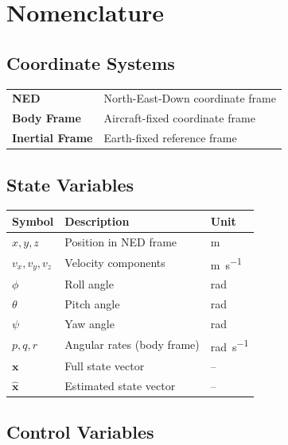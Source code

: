 
\chapter*{Nomenclature}

\section*{Coordinate Systems}

\begin{longtable}{@{}p{3cm}p{10cm}@{}}
    \textbf{NED} & North-East-Down coordinate frame \\
    \textbf{Body Frame} & Aircraft-fixed coordinate frame \\
    \textbf{Inertial Frame} & Earth-fixed reference frame \\
\end{longtable}

\section*{State Variables}

\begin{longtable}{@{}p{3cm}p{8cm}p{3cm}@{}}
    \toprule
    \textbf{Symbol} & \textbf{Description} & \textbf{Unit} \\
    \midrule
    \endhead
    $x, y, z$ & Position in NED frame & \si{\meter} \\
    $v_x, v_y, v_z$ & Velocity components & \si{\meter\per\second} \\
    $\phi$ & Roll angle & \si{\radian} \\
    $\theta$ & Pitch angle & \si{\radian} \\
    $\psi$ & Yaw angle & \si{\radian} \\
    $p, q, r$ & Angular rates (body frame) & \si{\radian\per\second} \\
    $\mathbf{x}$ & Full state vector & -- \\
    $\hat{\mathbf{x}}$ & Estimated state vector & -- \\
    \bottomrule
\end{longtable}

\section*{Control Variables}

